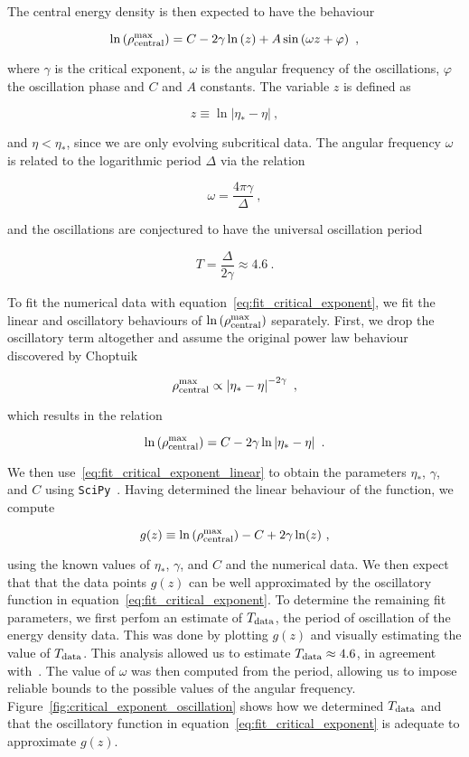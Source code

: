 \documentclass[a4paper,11pt]{article}
\newcommand{\g}{\gamma}
\newcommand{\D}{\Delta}
\newcommand{\lrpar}[1]{\left( #1 \right)}
\newcommand{\abs}[1]{\left| #1 \right|}
\newcommand{\n}{\noindent}
\newcommand{\eq}[1]{
  \begin{equation}
    #1
  \end{equation}
}
\begin{document}
The central energy density is then expected to have the behaviour

\eq{
\ln\lrpar{\rho^{\rm max}_{\rm central}} = C - 2\g\ln\lrpar{z} + A\sin\lrpar{\omega z + \varphi}\ ,\label{eq:fit_critical_exponent}
}

\n where $\g$ is the critical exponent, $\omega$ is the angular frequency of the oscillations, $\varphi$ the oscillation phase and $C$ and $A$ constants. The variable $z$ is defined as

\eq{
  z \equiv \ln\abs{\eta_{*}-\eta}\ ,
}

\n and $\eta<\eta_{*}$, since we are only evolving subcritical data. The angular frequency $\omega$ is related to the logarithmic period $\D$ via the relation

\eq{
  \omega = \frac{4\pi\g}{\D}\ ,\label{eq:universal_period_ito_omega}
}

\n and the oscillations are conjectured to have the universal oscillation period~\cite{PhysRevD.55.R440}

\eq{
  T = \frac{\D}{2\g} \approx 4.6\ .
}

To fit the numerical data with equation~\eqref{eq:fit_critical_exponent}, we fit the linear and oscillatory behaviours of $\ln\lrpar{\rho^{\rm max}_{\rm central}}$ separately. First, we drop the oscillatory term altogether and assume the original power law behaviour discovered by Choptuik

\eq{
  \rho^{\rm max}_{\rm central} \propto \abs{\eta_{*}-\eta}^{-2\g}\ ,
}

\n which results in the relation


\eq{
  \ln\lrpar{\rho^{\rm max}_{\rm central}} = C - 2\g\ln\abs{\eta_{*}-\eta}\ .\label{eq:fit_critical_exponent_linear}
}

\n We then use~\eqref{eq:fit_critical_exponent_linear} to obtain the parameters $\eta_{*}$, $\g$, and $C$ using {\tt SciPy}~\cite{2020SciPy-NMeth}. Having determined the linear behaviour of the function, we compute

\eq{
g(z) \equiv \ln\lrpar{\rho^{\rm max}_{\rm central}} - C + 2\g\ln(z)\ ,
}

\n using the known values of $\eta_{*}$, $\g$, and $C$ and the numerical data. We then expect that that the data points $g(z)$ can be well approximated by the oscillatory function in equation~\eqref{eq:fit_critical_exponent}. To determine the remaining fit parameters, we first perfom an estimate of $T_{\rm data}$, the period of oscillation of the energy density data. This was done by plotting $g(z)$ and visually estimating the value of $T_{\rm data}$. This analysis allowed us to estimate $T_{\rm data}\approx4.6$, in agreement with~\cite{PhysRevD.55.R440}. The value of $\omega$ was then computed from the period, allowing us to impose reliable bounds to the possible values of the angular frequency. Figure~\ref{fig:critical_exponent_oscillation} shows how we determined $T_{\rm data}$ and that the oscillatory function in equation~\eqref{eq:fit_critical_exponent} is adequate to approximate $g(z)$.
\end{document}
